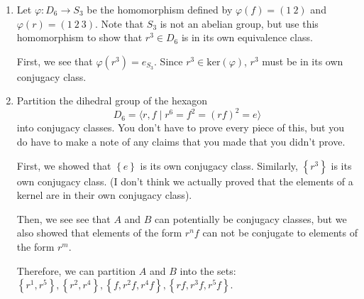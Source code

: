 \documentclass{article}
\newcommand{\Z}{\mathbb{Z}}
\newcommand{\set}[1]{\left\{#1\right\}}
\newcommand{\ang}[1]{\left\langle #1 \right\rangle}
\begin{document}
\begin{enumerate}
{        Similar to the previous proof, we examine the group presentation of the 
        image of \(\Phi\). 
        Notice that 
        \[\text{Im}_\Phi (D_6) = \ang{ 0, 1 \mid 1^6 = 0^2 = (01)^2 = e }\]
        shows that \(\Phi\) is a homomorphism.

        Now, let \(A = \set{r, rf, r^3, r^3f, r^5, r^5f}\), and 
        \(B = \set{e, f, r^2, r^2f, r^4, r^4f}\). Now, using the group presentation,
        notice that \(\Phi(a) = 1\) for all \(a \in A\), and \(\Phi(b) = 0\) for 
        all \(b \in B\). 0 and 1 are not conjugate in \(\Z / 2\Z\), therefore 
        none of the elements of \(A\) are conjugate to any of the elements of \(B\).
    }

    \item {
        Let \(\varphi\colon D_6 \to S_3\) be the homomorphism defined by \(\varphi(f) = (1\ 2)\) and \(\varphi(r) = (1\ 2\ 3)\). Note that \(S_3\) is not an abelian group, but use this homomorphism to show that \(r^3 \in D_6\) is in its own equivalence class.
    
        First, we see that \(\varphi(r^3) = e_{S_3}\). Since \(r^3 \in \text{ker}(\varphi)\),
        \(r^3\) must be in its own conjugacy class.
    }

    \item {
        Partition the dihedral group of the hexagon \[         D_6 = \langle r, f \mid r^6 = f^2 = (rf)^2 = e \rangle       \] into conjugacy classes. You don't have to prove every piece of this, but you do have to make a note of any claims that you made that you didn't prove.
        
        First, we showed that \(\set e\) is its own conjugacy class. 
        Similarly, \(\set{r^3}\) is its own conjugacy class. (I don't think 
        we actually proved that the elements of a kernel are in their own 
        conjugacy class).

        Then, we see see that \(A\) and \(B\) can potentially be conjugacy
        classes, but we also showed that elements of the form \(r^nf\) can not 
        be conjugate to elements of the form \(r^m\).

        Therefore, we can partition \(A\) and \(B\) into the sets:
        \(\set{r^1, r^5}, \set{r^2, r^4}, \set{f, r^2f, r^4f}, \set{rf, r^3f, r^5f}\).
    }
\end{enumerate}
  
\end{document}
